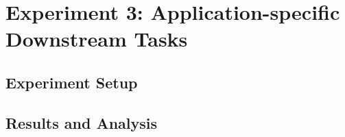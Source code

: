 \section{Experiment 3: Application-specific Downstream Tasks}
\label{Expt_3}


\subsection{Experiment Setup}


\subsection{Results and Analysis}
